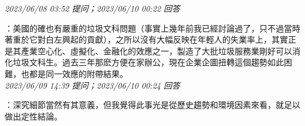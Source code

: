 \documentclass[twocolumn]{ctexart}
\begin{document}
\textit{\hfill\noindent\small 2023/06/08 03:52 提问；2023/06/10 00:22 回答}

：美國的確也有嚴重的垃圾文科問題（事實上幾年前我已經討論過了，只不過當時著重於它對白左興起的貢獻），之所以沒有大幅反映在年輕人的失業率上，其實正是其產業空心化、虛擬化、金融化的效應之一，製造了大批垃圾服務業剛好可以消化垃圾文科生。過去三年那麽方便在家辦公，現在企業企圖扭轉這個趨勢如此困難，也都是同一效應的附帶結果。
\\

\textit{\hfill\noindent\small 2023/06/09 14:39 提问；2023/06/10 00:24 回答}

：深究細節當然有其意義，但我覺得此事光是從歷史趨勢和環境因素來看，就足以做出定性結論。
\\


 
\end{document}
